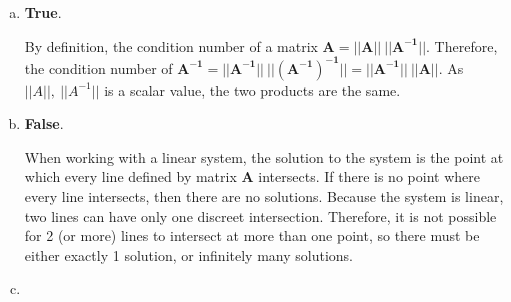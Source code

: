 \documentclass[11pt]{article}
\begin{document}
\begin{enumerate}
\begin{enumerate}[(a)]
		\item \textbf{True}.

		By definition, the condition number of a matrix $\mathbf{A = ||A||\ ||A^{-1}||}$. Therefore, the condition number of
		$\mathbf{A^{-1} = ||A^{-1}||\ ||(A^{-1})^{-1}|| = ||A^{-1}||\ ||A||}$. As $||A||,\ ||A^{-1}||$ is a scalar value, the two products are the same.

		\item \textbf{False}.

		When working with a linear system, the solution to the system is the point at which every line defined by matrix $\mathbf{A}$ intersects. If there is no
		point where every line intersects, then there are no solutions. Because the system is
		linear, two lines can have only one discreet intersection. Therefore, it is not possible for 2 (or more) lines to intersect at more than one point, so there
		must be either exactly 1 solution, or infinitely many solutions. \\

	\item

	\end{enumerate}

\end{enumerate}
\end{document}
